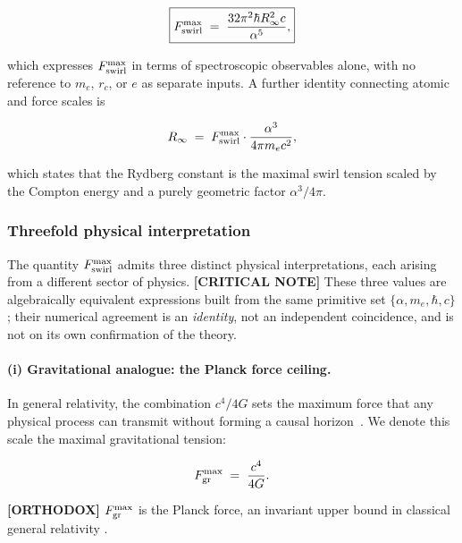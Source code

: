 \documentclass[11pt]{article}
\theoremstyle{definition}
\theoremstyle{plain}
\theoremstyle{remark}
\newcommand{\rc}{{r_c}}
\begin{document}
        \begin{align}
            \boxed{
            F_{\rm swirl}^{\max}
            \;=\; \frac{32\pi^2\hbar R_\infty^2 c}{\alpha^5},
            }
            \label{eq:Fmax_Rydberg}
        \end{align}

        which expresses $F_{\rm swirl}^{\max}$ in terms of spectroscopic observables alone, with no reference to $m_e$, $\rc$, or $e$ as separate inputs. A further identity connecting atomic and force scales is

        \begin{align}
            R_\infty \;=\; F_{\rm swirl}^{\max} \cdot \frac{\alpha^3}{4\pi m_e c^2},
            \label{eq:Rydberg_Fmax}
        \end{align}

        which states that the Rydberg constant is the maximal swirl tension scaled by the Compton energy and a purely geometric factor $\alpha^3/4\pi$.

        \subsubsection{Threefold physical interpretation}

        The quantity $F_{\rm swirl}^{\max}$ admits three distinct physical interpretations, each arising from a different sector of physics. \textbf{[CRITICAL NOTE]} These three values are algebraically equivalent expressions built from the same primitive set $\{\alpha,m_e,\hbar,c\}$; their numerical agreement is an \emph{identity}, not an independent coincidence, and is not on its own confirmation of the theory.

        \paragraph{(i) Gravitational analogue: the Planck force ceiling.}

        In general relativity, the combination $c^4/4G$ sets the maximum force that any physical process can transmit without forming a causal horizon~\cite{Gibbons2002}. We denote this scale the maximal gravitational tension:

        \begin{align}
            F_{\rm gr}^{\max} \;=\; \frac{c^4}{4G}.
            \label{eq:Fgr}
        \end{align}

        \textbf{[ORTHODOX]} $F_{\rm gr}^{\max}$ is the Planck force, an invariant upper bound in classical general relativity \cite{Gibbons2002}.
\end{document}
